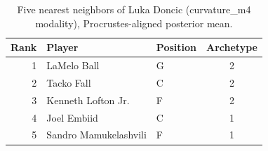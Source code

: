 \begin{table}[htbp]
  \centering\small
  \begin{tabular}{rllc}
    \toprule
    Rank & Player & Position & Archetype \\
    \midrule
    1 & LaMelo Ball & G & 2 \\
    2 & Tacko Fall & C & 2 \\
    3 & Kenneth Lofton Jr. & F & 2 \\
    4 & Joel Embiid & C & 1 \\
    5 & Sandro Mamukelashvili & F & 1 \\
    \bottomrule
  \end{tabular}
  \caption{Five nearest neighbors of Luka Doncic (curvature_m4 modality), Procrustes-aligned posterior mean.}
  \label{tab:Luka_Doncic_neighbors_curvature_m4}
\end{table}

